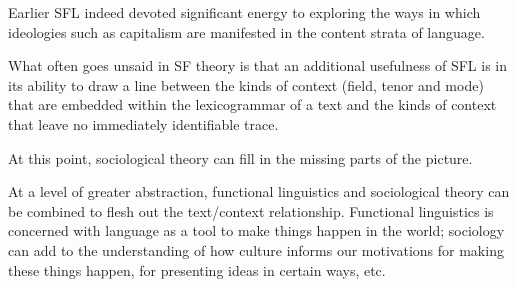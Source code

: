             Earlier SFL indeed devoted significant energy to exploring the ways in which ideologies such as capitalism are manifested in the content strata of language.

	What often goes unsaid in SF theory is that an additional usefulness of SFL is in its ability to draw a line between the kinds of context (field, tenor and mode) that are embedded within the lexicogrammar of a text and the kinds of context that leave no immediately identifiable trace.

	At this point, sociological theory can fill in the missing parts of the picture. 

	At a level of greater abstraction, functional linguistics and sociological theory can be combined to flesh out the text\slash context relationship. Functional linguistics is concerned with language as a tool to make things happen in the world; sociology can add to the understanding of how culture informs our motivations for making these things happen, for presenting ideas in certain ways, etc.

%